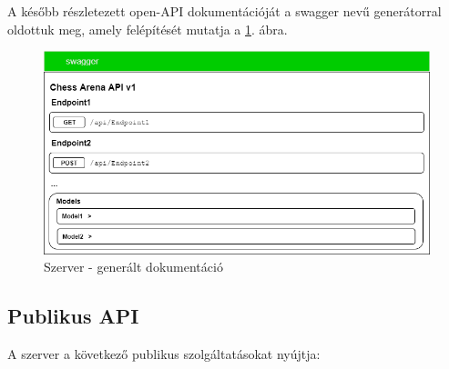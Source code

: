 \documentclass[twoside, a4paper, 12pt]{article}
\begin{document}
A később részletezett open-API dokumentációját a swagger nevű generátorral oldottuk meg, amely felépítését mutatja a \ref{fig:serverUiDocumentation}. ábra.

\begin{figure}[htbp]
	\centering
	\includegraphics[width=1.0\textwidth]{img/serverUiDocumentation.png}
	\caption{Szerver - generált dokumentáció}
	\label{fig:serverUiDocumentation}
\end{figure}


\subsection{Publikus API}
A szerver a következő publikus szolgáltatásokat nyújtja:
\end{document}
